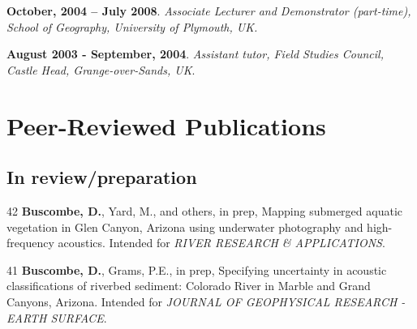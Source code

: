 \documentclass[margin,line]{resume}
\begin{document}
\begin{resume}
\begin{footnotesize}
    {\bf October, 2004 -- July 2008}. {\sl Associate Lecturer and Demonstrator (part-time), School of Geography, University of Plymouth, UK.}

    {\bf August 2003 - September, 2004}. {\sl Assistant tutor, Field Studies Council, Castle Head, Grange-over-Sands, UK}. %
        \end{footnotesize}

    \section{\mysidestyle Peer-Reviewed Publications}

    \begin{footnotesize}
    


	\subsection{\mysidestyle In review/preparation}
	\begin{list1}

	\item[42] {\bf Buscombe, D.}, Yard, M., and others, in prep, Mapping submerged aquatic vegetation in Glen Canyon, Arizona using underwater photography and high-frequency acoustics. Intended for {\sl RIVER RESEARCH \& APPLICATIONS}.\\

	\item[41] {\bf Buscombe, D.}, Grams, P.E., in prep, Specifying uncertainty in acoustic classifications of riverbed sediment: Colorado River in Marble and Grand Canyons, Arizona. Intended for {\sl JOURNAL OF GEOPHYSICAL RESEARCH - EARTH SURFACE}.\\


\end{list1}
\end{footnotesize}
\end{resume}
\end{document}
